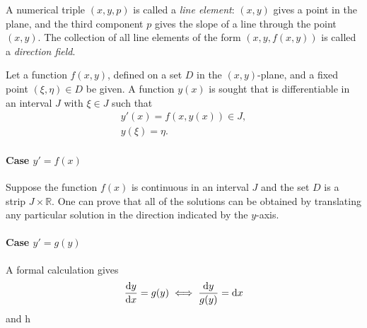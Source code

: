 \begin{definition}
  \label{definition-line-element}
  \label{definition-direction-field}
  A numerical triple \( (x, y, p) \) is called a \emph{line element}: \( (x, y) \) gives a point in the plane, and the third component \( p \) gives the slope of a line through the point \( (x, y) \).
  The collection of all line elements of the form \( (x, y, f(x, y)) \) is called a \emph{direction field}.
\end{definition}

\begin{definition}
  \label{definition-initial-condition}
  Let a function \( f(x, y) \), defined on a set \( D \) in the \( (x, y) \)-plane, and a fixed point \( (\xi, \eta) \in D \) be given.
  A function \( y(x) \) is sought that is differentiable in an interval \( J \) with \( \xi \in J \) such that
  \begin{align}
    y'(x) = f(x, y(x)) \in J,\\
    y(\xi) = \eta.
  \end{align}
\end{definition}

\paragraph{Case \( y' = f(x) \)}

Suppose the function \( f(x) \) is continuous in an interval \( J \) and the set \( D \) is a strip \( J \times \mathbb{R} \).
One can prove that all of the solutions can be obtained by translating any particular solution in the direction indicated by the \( y \)-axis.

\paragraph{Case \( y' = g(y) \)}

A formal calculation gives
\[
  \frac{\mathop{}\!\mathrm{d} y}{\mathop{}\!\mathrm{d} x} = g(y) \iff \frac{\mathop{}\!\mathrm{d} y}{g(y)} = \mathop{}\!\mathrm{d} x
\]
and h


